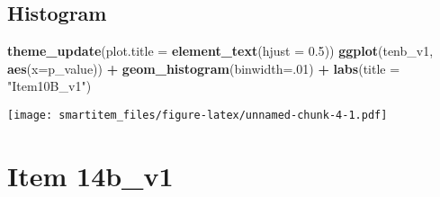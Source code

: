\documentclass[]{book}
\newenvironment{Shaded}{\begin{snugshade}}{\end{snugshade}}
\newcommand{\KeywordTok}[1]{\textcolor[rgb]{0.13,0.29,0.53}{\textbf{#1}}}
\newcommand{\DataTypeTok}[1]{\textcolor[rgb]{0.13,0.29,0.53}{#1}}
\newcommand{\DecValTok}[1]{\textcolor[rgb]{0.00,0.00,0.81}{#1}}
\newcommand{\FloatTok}[1]{\textcolor[rgb]{0.00,0.00,0.81}{#1}}
\newcommand{\StringTok}[1]{\textcolor[rgb]{0.31,0.60,0.02}{#1}}
\newcommand{\OperatorTok}[1]{\textcolor[rgb]{0.81,0.36,0.00}{\textbf{#1}}}
\newcommand{\NormalTok}[1]{#1}
\theoremstyle{definition}
\theoremstyle{definition}
\theoremstyle{definition}
\theoremstyle{remark}
\begin{document}
\subsection{Histogram}\label{histogram}

\begin{Shaded}
\begin{Highlighting}[]
\KeywordTok{theme_update}\NormalTok{(}\DataTypeTok{plot.title =} \KeywordTok{element_text}\NormalTok{(}\DataTypeTok{hjust =} \FloatTok{0.5}\NormalTok{))}
\KeywordTok{ggplot}\NormalTok{(tenb_v1, }\KeywordTok{aes}\NormalTok{(}\DataTypeTok{x=}\NormalTok{p_value)) }\OperatorTok{+}\StringTok{ }\KeywordTok{geom_histogram}\NormalTok{(}\DataTypeTok{binwidth=}\NormalTok{.}\DecValTok{01}\NormalTok{) }\OperatorTok{+}\StringTok{ }\KeywordTok{labs}\NormalTok{(}\DataTypeTok{title =} \StringTok{"Item10B_v1"}\NormalTok{) }
\end{Highlighting}
\end{Shaded}

\texttt{[image: smartitem\_files/figure-latex/unnamed-chunk-4-1.pdf]}

\section{Item 14b\_v1}\label{item-14b_v1}

\begin{Shaded}
\end{Shaded}
\end{document}
